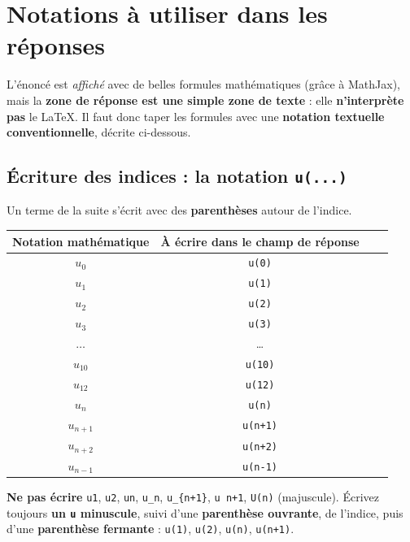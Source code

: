 \documentclass[11pt,a4paper]{article}
\begin{document}
\section{Notations à utiliser dans les réponses}
\label{sec:notations}

\begin{attention}
L'énoncé est \emph{affiché} avec de belles formules mathématiques (grâce à MathJax),
mais la \textbf{zone de réponse est une simple zone de texte} : elle \textbf{n'interprète
pas} le \LaTeX. Il faut donc taper les formules avec une \textbf{notation textuelle
conventionnelle}, décrite ci-dessous.
\end{attention}

\subsection{Écriture des indices : la notation \texttt{u(...)}}

Un terme de la suite s'écrit avec des \textbf{parenthèses} autour de l'indice.

\begin{center}
\renewcommand{\arraystretch}{1.35}
\begin{tabular}{cc>{\ttfamily}cc}
\toprule
\textbf{Notation mathématique} & \textbf{À écrire dans le champ de réponse} \\
\midrule
\(u_0\)   & \verb|u(0)| \\
\(u_1\)   & \verb|u(1)| \\
\(u_2\)   & \verb|u(2)| \\
\(u_3\)   & \verb|u(3)| \\
\(\dots\) & \dots \\
\(u_{10}\) & \verb|u(10)| \\
\(u_{12}\) & \verb|u(12)| \\
\(u_n\)   & \verb|u(n)| \\
\(u_{n+1}\) & \verb|u(n+1)| \\
\(u_{n+2}\) & \verb|u(n+2)| \\
\(u_{n-1}\) & \verb|u(n-1)| \\
\bottomrule
\end{tabular}
\end{center}

\begin{attention}
\textbf{Ne pas écrire} \verb|u1|, \verb|u2|, \verb|un|, \verb|u_n|,
\verb|u_{n+1}|, \verb|u n+1|, \verb|U(n)| (majuscule).
Écrivez toujours \textbf{un \texttt{u} minuscule}, suivi d'une \textbf{parenthèse
ouvrante}, de l'indice, puis d'une \textbf{parenthèse fermante} :
\verb|u(1)|, \verb|u(2)|, \verb|u(n)|, \verb|u(n+1)|.
\end{attention}
\end{document}

